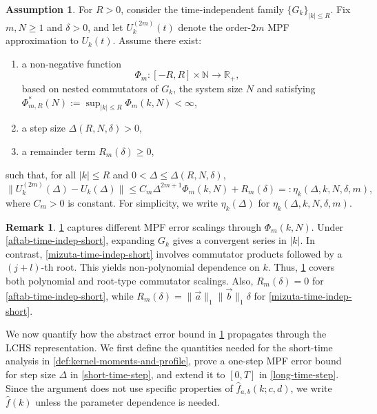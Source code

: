 \documentclass[10pt,reqno]{article}
\numberwithin{equation}{section}
\theoremstyle{plain}
\theoremstyle{definition}
\newtheorem{assumption}[thm]{Assumption}
\newtheorem{remark}[thm]{Remark}
\begin{document}
\begin{assumption}
\label{abstract-time-indep-mpf-revised}
For \(R>0\), consider the time-independent family \(\{G_k\}_{|k|\leq R}\). Fix \(m,N\geq 1\) and \(\delta>0\), and let \(U_k^{(2m)}(t)\) denote the order-\(2m\) MPF approximation to \(U_k(t)\). Assume there exist:
\begin{enumerate}
    \item a non-negative function
    \begin{equation}
    \Phi_m:[-R,R]\times\mathbb{N}\to\mathbb{R}_+,
    \end{equation}
    based on nested commutators of \(G_k\), the system size $N$ and satisfying
    $\Phi_{m,R}^{\ast}(N):=\sup_{|k|\le R}\Phi_m(k,N)<\infty$,
    \item a step size \(\Delta(R,N,\delta)>0\),
    \item a remainder term \(R_m(\delta)\geq 0\),
\end{enumerate}
such that, for all \(|k|\leq R\) and \(0<\Delta\leq\Delta(R,N,\delta)\),
\begin{equation}
\|U_k^{(2m)}(\Delta)-U_k(\Delta)\| \leq C_m\Delta^{2m+1}\Phi_m(k,N)+R_m(\delta) =:\eta_k(\Delta,k,N,\delta,m),
\end{equation}
where \(C_m>0\) is constant. For simplicity, we write \(\eta_k(\Delta)\) for \(\eta_k(\Delta,k,N,\delta,m)\).
\end{assumption}

\begin{remark}
\cref{abstract-time-indep-mpf-revised} captures different MPF error scalings through $\Phi_m(k,N)$. Under \cref{aftab-time-indep-short}, expanding $G_k$ gives a convergent series in $|k|$. In contrast, \cref{mizuta-time-indep-short} involves commutator products followed by a $(j+l)$-th root. This yields non-polynomial dependence on $k$. Thus, \cref{abstract-time-indep-mpf-revised} covers both polynomial and root-type commutator scalings. Also, $R_m(\delta)=0$ for \cref{aftab-time-indep-short}, while $R_m(\delta)=\|\vec a\|_1\|\vec b\|_1\delta$ for \cref{mizuta-time-indep-short}.
\end{remark}

We now quantify how the abstract error bound in \cref{abstract-time-indep-mpf-revised} propagates through the LCHS representation. We first define the quantities needed for the short-time analysis in \cref{def:kernel-moments-and-profile}, prove a one-step MPF error bound for step size $\Delta$ in \cref{short-time-step}, and extend it to $[0,T]$ in \cref{long-time-step}. Since the argument does not use specific properties of \(\hat f_{a,b}(k;c,d)\), we write \(\hat f(k)\) unless the parameter dependence is needed.
\end{document}
